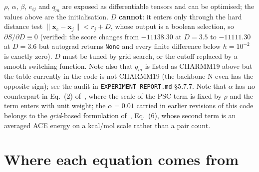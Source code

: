 \documentclass[11pt,a4paper]{article}
\begin{document}
$\rho$, $\alpha$, $\beta$, $e_{ij}$ and $q_m$ are exposed as differentiable
tensors and can be optimised; the values above are the initialisation.
$D$ \textbf{cannot}: it enters only through the hard distance test
$\lVert\mathbf{x}_c-\mathbf{x}_j\rVert < r_j + D$, whose output is a boolean
selection, so $\partial S/\partial D \equiv 0$ (verified: the score changes
from $-11138.30$ at $D=3.5$ to $-11111.30$ at $D=3.6$ but autograd returns
\texttt{None} and every finite difference below $h=10^{-2}$ is exactly zero).
$D$ must be tuned by grid search, or the cutoff replaced by a smooth switching
function. Note also that $q_m$ is listed as CHARMM19 above but the table
currently in the code is not CHARMM19 (the backbone N even has the opposite
sign); see the audit in \texttt{EXPERIMENT\_REPORT.md} \S5.7.7. Note that $\alpha$ has no counterpart in
Eq.~(2) of~\cite{Chen2003zdock}, where the scale of the PSC term is fixed by
$\rho$ and the term enters with unit weight; the $\alpha = 0.01$ carried in
earlier revisions of this code belongs to the \emph{grid}-based
formulation of~\cite{ChenWeng2002}, Eq.~(6), whose second term is an averaged
ACE energy on a kcal/mol scale rather than a pair count.

\section{Where each equation comes from}
\end{document}
